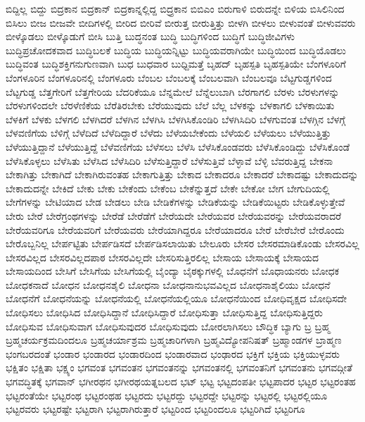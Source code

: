 {ಬಿದ್ದಿಲ್ಲ
ಬಿದ್ದು
ಬಿದ್ರಕಾನ
ಬಿದ್ರಕಾನ್
ಬಿದ್ರಕಾನ್ನಲ್ಲಿದ್ದ
ಬಿದ್ರ್ರಕಾನ
ಬಿಬಿಎಂ
ಬಿರುಗಾಳಿ
ಬಿರುದನ್ನೇ
ಬಿಳಿಯ
ಬಿಸಿಲಿನಿಂದ
ಬಿಸಿಲು
ಬೀಜ
ಬೀಜವೇ
ಬೀದಿಗಳಲ್ಲಿ
ಬೀರಿದ
ಬೀರಿವೆ
ಬೀರುತ್ತ
ಬೀರುತ್ತಿತ್ತು
ಬೀಳಗಿ
ಬೀಳಲು
ಬೀಳುವಂತೆ
ಬೀಳುವವರು
ಬೀಳ್ಕೊಡಲು
ಬೀಳ್ಕೊಡುಗೆ
ಬೀಸಿ
ಬುತ್ತಿ
ಬುದ್ಧನಂತ
ಬುದ್ಧಿ
ಬುದ್ಧಿಗಳಿಂದ
ಬುದ್ಧಿಗೆ
ಬುದ್ಧಿಜೀವಿಗಳು
ಬುದ್ಧಿಪ್ರಚೋದಕವಾದ
ಬುದ್ಧಿಬಲಕೆ
ಬುದ್ಧಿಯ
ಬುದ್ಧಿಯನ್ನಿಟ್ಟು
ಬುದ್ಧಿಯವರಾಗಿಯೇ
ಬುದ್ಧಿಯಿಂದ
ಬುದ್ಧಿಯೊಡಲು
ಬುದ್ಧಿವಂತ
ಬುದ್ಧಿಶಕ್ತಿಗನುಗುಣವಾಗಿ
ಬುಧ
ಬುಧವಾರ
ಬುಧ್ದಿಮತ್ತೆ
ಬೃಹದ್
ಬೃಹಸ್ಪತಿ
ಬೃಹಸ್ಪತಿಯೇ
ಬೆಂಗಳೂರಿಗೆ
ಬೆಂಗಳೂರಿನ
ಬೆಂಗಳೂರಿನಲ್ಲಿ
ಬೆಂಗಳೂರು
ಬೆಂಬಲ
ಬೆಂಬಲಕ್ಕೆ
ಬೆಂಬಲವಾಗಿ
ಬೆಂಬಲವೂ
ಬೆಟ್ಟಗುಡ್ಡಗಳಿಂದ
ಬೆಟ್ಟಗುಡ್ಡ
ಬೆತ್ತಗೇರಿಗೆ
ಬೆತ್ತಗೇರಿಯ
ಬೆದರಿಕೆಯೂ
ಬೆನ್ನಮೇಲೆ
ಬೆನ್ನೆಲುಬಾಗಿ
ಬೆರಗಾಗಲಿ
ಬೆರಳು
ಬೆರಳುಗಳನ್ನು
ಬೆರಳುಗಳಿಂದಲೇ
ಬೆರಳೆಣಿಕೆಯ
ಬೆರೆತಿರಬೇಕು
ಬೆರೆಯುವುದು
ಬೆಲೆ
ಬೆಲ್ಲ
ಬೆಳಕನ್ನು
ಬೆಳಕಾಗಲಿ
ಬೆಳಕಾಯಿತು
ಬೆಳಕಿಗೆ
ಬೆಳಕು
ಬೆಳಗಲಿ
ಬೆಳಗಿದರೆ
ಬೆಳಗಿನ
ಬೆಳಗಿಸಿ
ಬೆಳಗಿಸಿಕೊಂಡಿರಿ
ಬೆಳಗಿಸಿದಿರಿ
ಬೆಳಗುವಂತ
ಬೆಳಗ್ಗಿನ
ಬೆಳಗ್ಗೆ
ಬೆಳವಣಿಗೆಯ
ಬೆಳಿಗ್ಗೆ
ಬೆಳೆದಿದೆ
ಬೆಳೆದಿದ್ದಾರೆ
ಬೆಳೆದು
ಬೆಳೆಯಬೇಕೆಂದು
ಬೆಳೆಯಲಿ
ಬೆಳೆಯಲು
ಬೆಳೆಯುತ್ತಿತ್ತು
ಬೆಳೆಯುತ್ತಿದ್ದಾನೆ
ಬೆಳೆಯುತ್ತಿದ್ದೆ
ಬೆಳೆವಣಿಗೆಯ
ಬೆಳೆಸಲು
ಬೆಳೆಸಿ
ಬೆಳೆಸಿಕೊಂಡವರು
ಬೆಳೆಸಿಕೊಂಡಿದ್ದು
ಬೆಳೆಸಿಕೊಂಡೆ
ಬೆಳೆಸಿಕೊಳ್ಳಲು
ಬೆಳೆಸಿತು
ಬೆಳೆಸಿದ
ಬೆಳೆಸಿದಿರಿ
ಬೆಳೆಸುತ್ತಿದ್ದಾರೆ
ಬೆಳೆಸುತ್ತಿವೆ
ಬೆಳ್ಳಾವೆ
ಬೆಳ್ಳಿ
ಬೆವರುತ್ತಿದ್ದ
ಬೇಕನಾ
ಬೇಕಾಗಿತ್ತು
ಬೇಕಾಗಿದೆ
ಬೇಕಾಗಿರುವಂತಹ
ಬೇಕಾಗುತ್ತಿತ್ತು
ಬೇಕಾದ
ಬೇಕಾದರೂ
ಬೇಕಾದರೆ
ಬೇಕಾದಷ್ಟು
ಬೇಕಾದುದನ್ನು
ಬೇಕಾದುದನ್ನೇ
ಬೇಕಿದೆ
ಬೇಕು
ಬೇಕು
ಬೇಕೆಂದು
ಬೇಕೆಂಬ
ಬೇಕೆನ್ನುತ್ತದೆ
ಬೇಕೇ
ಬೇಕೋ
ಬೇಗ
ಬೇಗುದಿಯಲ್ಲಿ
ಬೇಗೆಗಳನ್ನು
ಬೇಟಿಯಾದ
ಬೇಡ
ಬೇಡಲು
ಬೇಡಿ
ಬೇಡಿಕೆಗಳನ್ನು
ಬೇಡಿಕೆಯನ್ನು
ಬೇಡಿಕೆಯಿಟ್ಟರು
ಬೇಡಿಕೊಳ್ಳುತ್ತೇವೆ
ಬೇರು
ಬೇರೆ
ಬೇರೆಗ್ರಂಥಗಳನ್ನು
ಬೇರೆಡೆ
ಬೇರೆಡೆಗೆ
ಬೇರೆಯದೇ
ಬೇರೆಯವರ
ಬೇರೆಯವರನ್ನು
ಬೇರೆಯವರಾದರೆ
ಬೇರೆಯವರಿಗೂ
ಬೇರೆಯವರಿಗೆ
ಬೇರೆಯವರು
ಬೇರೆಯಾಗಿದ್ದರೂ
ಬೇರೆಯಾದರೂ
ಬೇರೆ
ಬೇರೆಬೇರೆ
ಬೇರೊಂದು
ಬೇರೊಬ್ಬನಿಲ್ಲ
ಬೇರ್ಪಟ್ಟಿತು
ಬೇರ್ಪಡಿಸದೆ
ಬೇರ್ಪಡಿಸಲಾಯಿತು
ಬೇಲೂರು
ಬೇಸರ
ಬೇಸರಮಾಡಿಕೊಂಡು
ಬೇಸರವಿಲ್ಲ
ಬೇಸರವಿಲ್ಲದ
ಬೇಸರವಿಲ್ಲದಪಾಠ
ಬೇಸರವಿಲ್ಲದೇ
ಬೇಸರಿಸುತ್ತಿರಲಿಲ್ಲ
ಬೇಸಾಯ
ಬೇಸಾಯಕ್ಕೆ
ಬೇಸಾಯದ
ಬೇಸಾಯದಿಂದ
ಬೇಸಿಗೆ
ಬೇಸಿಗೆಯ
ಬೇಸಿಗೆಯಲ್ಲಿ
ಬೈಂದ್ಯಾ
ಬೈಠಕ್ಕುಗಳಲ್ಲಿ
ಬೊಧನೆಗೆ
ಬೊಧಾಯನರು
ಬೋಧಕ
ಬೋಧಕನಾದೆ
ಬೋಧನ
ಬೋಧನಶೈಲಿ
ಬೋಧನಾ
ಬೋಧನಾನುಭವವಿಲ್ಲದ
ಬೋಧನಾಶೈಲಿಯು
ಬೋಧನೆ
ಬೋಧನೆಗೆ
ಬೋಧನೆಯನ್ನು
ಬೋಧನೆಯಲ್ಲಿ
ಬೋಧನೆಯಲ್ಲಿಯೂ
ಬೋಧನೆಯಿಂದ
ಬೋಧಿವೃಕ್ಷದ
ಬೋಧಿಸದೇ
ಬೋಧಿಸಲು
ಬೋಧಿಸಿದ
ಬೋಧಿಸಿದ್ದಾನೆ
ಬೋಧಿಸಿದ್ದಾರೆ
ಬೋಧಿಸುತ್ತಾ
ಬೋಧಿಸುತ್ತಿದ್ದ
ಬೋಧಿಸುತ್ತಿದ್ದರು
ಬೋಧಿಸುವ
ಬೋಧಿಸುವಾಗ
ಬೋಧಿಸುವುದರ
ಬೋಧಿಸುವುದು
ಬೋರಲಾಗಿಸಲು
ಬೌದ್ಧಿಕ
ಬ್ಯಾಗು
ಬ್ರ
ಬ್ರಹ್ಮ
ಬ್ರಹ್ಮಚರ್ಯಕ್ರಮದಿಂದಲೂ
ಬ್ರಹ್ಮಚರ್ಯಾಶ್ರಮ
ಬ್ರಹ್ಮಚಾರಿಗಳಾಗಿ
ಬ್ರಹ್ಮವಿದ್ಯೋಪನಿಷತ್
ಬ್ರಹ್ಮಾಂಡಗಳ
ಬ್ರಾಹ್ಮಣ
ಭಂಗಬರದಂತೆ
ಭಂಡಾರ
ಭಂಡಾರದ
ಭಂಡಾರದಿಂದ
ಭಂಡಾರವಾದ
ಭಂಢಾರದ
ಭಕ್ತಿಗೆ
ಭಕ್ತಿಯ
ಭಕ್ತಿಯುಳ್ಳವರು
ಭಕ್ಷಿತಂ
ಭಕ್ಷಿತಾ
ಭಕ್ಷ್ಯಂ
ಭಗವಂತ
ಭಗವಂತನ
ಭಗವಂತನನ್ನು
ಭಗವಂತನಲ್ಲಿ
ಭಗವಂತನಿಗೆ
ಭಗವಂತನು
ಭಗವದ್ಗೀತೆ
ಭಗವದ್ಧಿತಕ್ಕೆ
ಭಗವಾನ್
ಭಗೀರಥನ
ಭಗೀರಥಯತ್ನಬಲದ
ಭಟ್
ಭಟ್ಟ
ಭಟ್ಟದಂಪತೀ
ಭಟ್ಟಪಾದರ
ಭಟ್ಟರ
ಭಟ್ಟರಂತಹ
ಭಟ್ಟರಂತೆಯೇ
ಭಟ್ಟರಂಥ
ಭಟ್ಟರಂಥಹ
ಭಟ್ಟರದು
ಭಟ್ಟರದ್ದು
ಭಟ್ಟರದ್ದೇ
ಭಟ್ಟರನ್ನು
ಭಟ್ಟರಲ್ಲಿ
ಭಟ್ಟರಲ್ಲಿಯೂ
ಭಟ್ಟರವರು
ಭಟ್ಟರಷ್ಟೇ
ಭಟ್ಟರಾಗಿ
ಭಟ್ಟರಾಗಿರುತ್ತಾರೆ
ಭಟ್ಟರಿಂದ
ಭಟ್ಟರಿಂದಲೂ
ಭಟ್ಟರಿಗಿದೆ
ಭಟ್ಟರಿಗೂ
}
